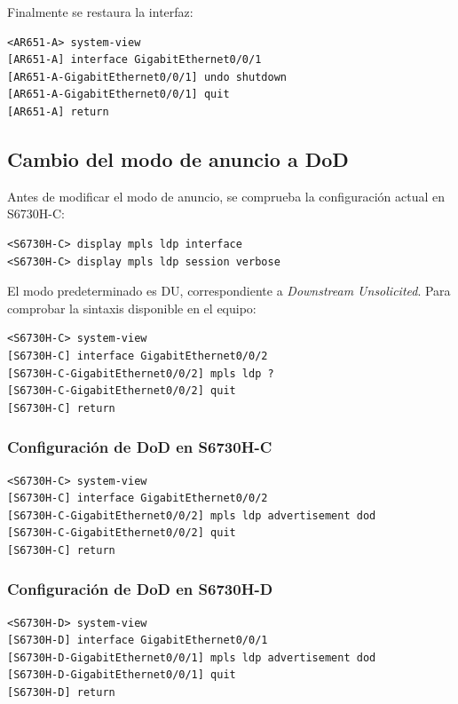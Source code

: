 Finalmente se restaura la interfaz:

\begin{lstlisting}[style=terminal]
<AR651-A> system-view
[AR651-A] interface GigabitEthernet0/0/1
[AR651-A-GigabitEthernet0/0/1] undo shutdown
[AR651-A-GigabitEthernet0/0/1] quit
[AR651-A] return
\end{lstlisting}

\subsection{Cambio del modo de anuncio a DoD}

Antes de modificar el modo de anuncio, se comprueba la configuración actual
en S6730H-C:

\begin{lstlisting}[style=terminal]
<S6730H-C> display mpls ldp interface
<S6730H-C> display mpls ldp session verbose
\end{lstlisting}

El modo predeterminado es DU, correspondiente a \textit{Downstream
Unsolicited}. Para comprobar la sintaxis disponible en el equipo:

\begin{lstlisting}[style=terminal]
<S6730H-C> system-view
[S6730H-C] interface GigabitEthernet0/0/2
[S6730H-C-GigabitEthernet0/0/2] mpls ldp ?
[S6730H-C-GigabitEthernet0/0/2] quit
[S6730H-C] return
\end{lstlisting}

\subsubsection{Configuración de DoD en S6730H-C}

\begin{lstlisting}[style=terminal]
<S6730H-C> system-view
[S6730H-C] interface GigabitEthernet0/0/2
[S6730H-C-GigabitEthernet0/0/2] mpls ldp advertisement dod
[S6730H-C-GigabitEthernet0/0/2] quit
[S6730H-C] return
\end{lstlisting}

\subsubsection{Configuración de DoD en S6730H-D}

\begin{lstlisting}[style=terminal]
<S6730H-D> system-view
[S6730H-D] interface GigabitEthernet0/0/1
[S6730H-D-GigabitEthernet0/0/1] mpls ldp advertisement dod
[S6730H-D-GigabitEthernet0/0/1] quit
[S6730H-D] return
\end{lstlisting}

